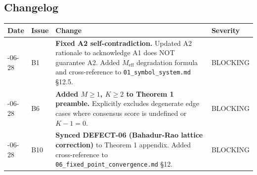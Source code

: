 \documentclass[
  12pt,
]{article}
\begin{document}
\subsection{Changelog}\label{changelog}

\begin{longtable}[]{@{}
  >{\raggedright\arraybackslash}p{}
  >{\raggedright\arraybackslash}p{}
  >{\raggedright\arraybackslash}p{}
  >{\raggedright\arraybackslash}p{}@{}}
\toprule\noalign{}
\begin{minipage}[b]{\linewidth}\raggedright
Date
\end{minipage} & \begin{minipage}[b]{\linewidth}\raggedright
Issue
\end{minipage} & \begin{minipage}[b]{\linewidth}\raggedright
Change
\end{minipage} & \begin{minipage}[b]{\linewidth}\raggedright
Severity
\end{minipage} \\
\midrule\noalign{}
\endhead
\bottomrule\noalign{}
\endlastfoot
2026-06-28 & B1 & \textbf{Fixed A2 self-contradiction.} Updated A2
rationale to acknowledge A1 does NOT guarantee A2. Added
\(M_{\text{eff}}\) degradation formula and cross-reference to
\texttt{01\_symbol\_system.md} §12.5. & BLOCKING \\
2026-06-28 & B6 & \textbf{Added \(M \geq 1\), \(K \geq 2\) to Theorem 1
preamble.} Explicitly excludes degenerate edge cases where consensus
score is undefined or \(K-1=0\). & BLOCKING \\
2026-06-28 & B10 & \textbf{Synced DEFECT-06 (Bahadur-Rao lattice
correction)} to Theorem 1 appendix. Added cross-reference to
\texttt{06\_fixed\_point\_convergence.md} §12. & BLOCKING \\
\end{longtable}
\end{document}

